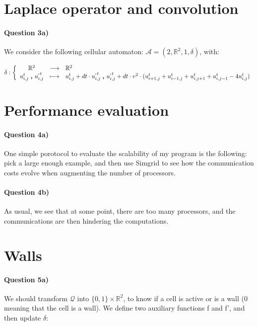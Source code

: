 \documentclass[a4paper,12pt]{article}
\begin{document}
\section{Laplace operator and convolution}

\paragraph{Question 3a)} We consider the following cellular automaton: $\mathcal{A} = (2, \mathbb{R}^2, 1, \delta)$, with:

\begin{eqnarray*}
\delta : \left \{ \begin{array}{c c l }
  \mathbb{R}^2 & \longrightarrow & \mathbb{R}^2 \\
  u^{t}_{i,j}\ \pmb{,} \ u^{_{'} t}_{i,j} & \longmapsto & u^{t}_{i,j} + dt \cdot u^{_{'} t}_{i,j}\ \pmb{,} \ u^{_{'} t}_{i,j} + dt \cdot v^2 \cdot (u^t_{i+1,j} + u^t_{i-1, j} + u^t_{i, j+1} + u^t_{i, j-1} - 4 u^t_{i, j})\\
  \end{array} \right .
\end{eqnarray*}


\section{Performance evaluation}

\paragraph{Question 4a)} One simple porotocol to evaluate the scalability of my program is the following: pick a large enough example, and then use Simgrid to see how the communication costs evolve when augmenting the number of processors.

\paragraph{Question 4b)} As usual, we see that at some point, there are too many processors, and the communications are then hindering the computations.


\section{Walls}

\paragraph{Question 5a)} We should transform $\mathcal{Q}$ into $\{0, 1\} \times \mathbb{R}^2$, to know if a cell is active or is a wall (0 meaning that the cell is a wall). We define two auxiliary functions f and f', and then update $\delta$: 
\end{document}
